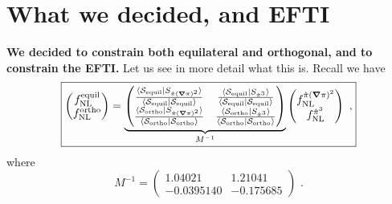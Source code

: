 \documentclass[aps,prd,amsmath,floats,floatfix,superscriptaddress,nofootinbib%
]{revtex4}%
\renewcommand\({\left(}
\renewcommand\){\right)}
\renewcommand\[{\left[}
\renewcommand\]{\right]}
\renewcommand{\vec}{\bm}
\begin{document}
\section{What we decided, and EFTI}
\label{sec:what_we_decided_and_EFTI} 


\noindent \textbf{We decided to constrain both equilateral and orthogonal, and to constrain the EFTI.} 
Let us see in more detail what this is. Recall we have 
\begin{equation}
\boxed{\begin{pmatrix}
f_{\rm NL}^{\rm equil} \\
f_{\rm NL}^{\rm ortho}
\end{pmatrix}
 = {\underbrace{\begin{pmatrix}
\frac{\braket{{\cal S}_{\rm equil}|S_{\dot{\pi}(\vec{\nabla}\pi)^2}}}{\braket{{\cal S}_{\rm equil}|{\cal S}_{\rm equil}}} & \frac{\braket{{\cal S}_{\rm equil}|S_{\dot{\pi}^3}}}{\braket{{\cal S}_{\rm equil}|{\cal S}_{\rm equil}}} \\
\frac{\braket{{\cal S}_{\rm ortho}|S_{\dot{\pi}(\vec{\nabla}\pi)^2}}}{\braket{{\cal S}_{\rm ortho}|{\cal S}_{\rm ortho}}} & \frac{\braket{{\cal S}_{\rm ortho}|S_{\dot{\pi}^3}}}{\braket{{\cal S}_{\rm ortho}|{\cal S}_{\rm ortho}}}
\end{pmatrix}}_{{M}^{-1}}}
\begin{pmatrix}
f_{\rm NL}^{\dot{\pi}(\vec{\nabla}\pi)^2} \\
f_{\rm NL}^{\dot{\pi}^3}
\end{pmatrix}\,\,,} 
\end{equation} 
where 
\begin{equation}
M^{-1} = \begin{pmatrix}
1.04021 & 1.21041 \\
-0.0395140 & -0.175685
\end{pmatrix}
\,\,. 
\end{equation}
\end{document}
